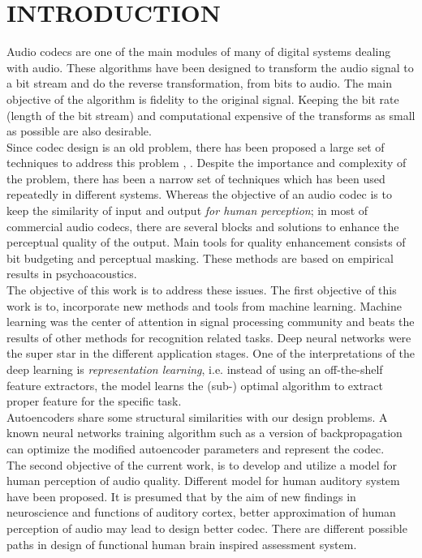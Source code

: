 \chapter{INTRODUCTION}

Audio codecs are one of the main modules of many of digital systems dealing with audio. These algorithms have been designed to transform the audio signal to a bit stream and do the reverse transformation, from bits to audio. The main objective of the algorithm is fidelity to the original signal. Keeping the bit rate (length of the bit stream) and computational expensive of the transforms as small as possible are also desirable.\\
Since codec design is an old problem, there has been proposed a large set of techniques to address this problem \cite{acelp}, \cite{trans}. Despite the importance and complexity of the problem, there has been a narrow set of techniques which has been used repeatedly in different systems. Whereas the objective of an audio codec is to keep the similarity of input and output \textit{for human perception}; in most of commercial audio codecs, there are several blocks and solutions to enhance the perceptual quality of the output. Main tools for quality enhancement consists of bit budgeting and perceptual masking. These methods are based on empirical results in psychoacoustics.\\
The objective of this work is to address these issues. The first objective of this work is to, incorporate new methods and tools from machine learning. Machine learning was the center of attention in signal processing community and beats the results of other methods for recognition related tasks. Deep neural networks were the super star in the different application stages. One of the interpretations of the deep learning is \textit{representation learning}, i.e. instead of using an off-the-shelf feature extractors, the model learns the (sub-) optimal algorithm to extract proper feature for the specific task.\\
Autoencoders share some structural similarities with our design problems. A known  neural networks training algorithm such as a version of backpropagation can optimize the modified autoencoder parameters and represent the codec.\\
The second objective of the current work, is to develop and utilize a model for human perception of audio quality. Different model for human auditory system have been proposed. It is presumed that by the aim of new findings in neuroscience and functions of auditory cortex, better approximation of human perception of audio may lead to design better codec. There are different possible paths in design of functional human brain inspired assessment system.
